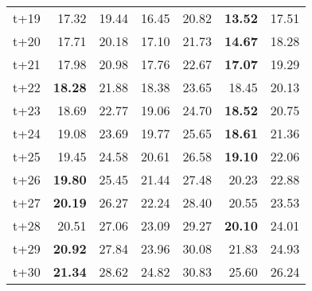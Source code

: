 \begin{table}[H]
\begin{tabular}{lrrrrrr}
t+19  & 17.32  & 19.44  & 16.45  & 20.82  & \textbf{13.52}  & 17.51  \\
t+20  & 17.71  & 20.18  & 17.10  & 21.73  & \textbf{14.67}  & 18.28  \\
t+21  & 17.98  & 20.98  & 17.76  & 22.67  & \textbf{17.07}  & 19.29  \\
t+22  & \textbf{18.28}  & 21.88  & 18.38  & 23.65  & 18.45  & 20.13  \\
t+23  & 18.69  & 22.77  & 19.06  & 24.70  & \textbf{18.52}  & 20.75  \\
t+24  & 19.08  & 23.69  & 19.77  & 25.65  & \textbf{18.61}  & 21.36  \\
t+25  & 19.45  & 24.58  & 20.61  & 26.58  & \textbf{19.10}  & 22.06  \\
t+26  & \textbf{19.80}  & 25.45  & 21.44  & 27.48  & 20.23  & 22.88  \\
t+27  & \textbf{20.19}  & 26.27  & 22.24  & 28.40  & 20.55  & 23.53  \\
t+28  & 20.51  & 27.06  & 23.09  & 29.27  & \textbf{20.10}  & 24.01  \\
t+29  & \textbf{20.92}  & 27.84  & 23.96  & 30.08  & 21.83  & 24.93  \\
t+30  & \textbf{21.34}  & 28.62  & 24.82  & 30.83  & 25.60  & 26.24  \\

\bottomrule
\end{tabular}
\end{table}
